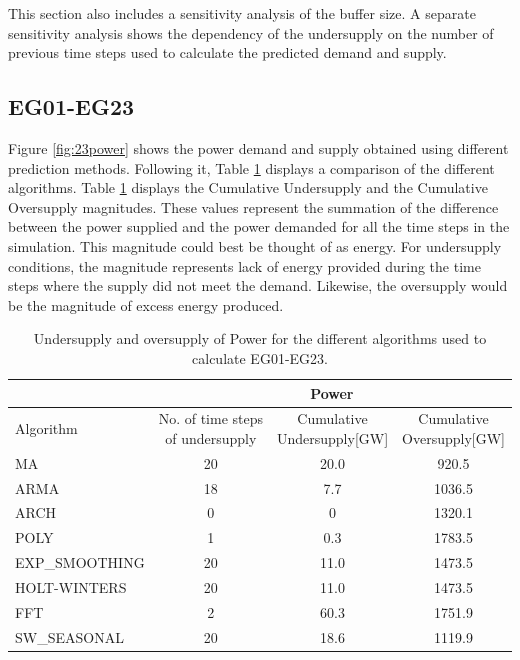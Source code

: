 \documentclass[11pt,letterpaper]{article}
\begin{document}
This section also includes a sensitivity analysis of the buffer size. A separate sensitivity analysis shows the dependency of the undersupply on the number of previous time steps used to calculate the predicted demand and supply.

\subsection{EG01-EG23}

Figure \ref{fig:23power} shows the power demand and supply obtained using different prediction methods. Following it, Table \ref{tab:23-power} displays a comparison of the different algorithms. Table \ref{tab:23-power} displays the Cumulative Undersupply and the Cumulative Oversupply magnitudes. These values represent the summation of the difference between the power supplied and the power demanded for all the time steps in the simulation. This magnitude could best be thought of as energy. For undersupply conditions, the magnitude represents lack of energy provided during the time steps where the supply did not meet the demand. Likewise, the oversupply would be the magnitude of excess energy produced.

\begin{table}[!h]
	\centering
	\caption {Undersupply and oversupply of Power for the different algorithms used to calculate EG01-EG23.}
	\label{tab:23-power}
	\begin{tabular}{|l|c|c|c|}
		\hline
		& \multicolumn{3}{c|}{Power} \\ \hline
		Algorithm & \shortstack{No. of time steps\\of undersupply}  & 
		\shortstack{Cumulative\\Undersupply[GW]}  & \shortstack{Cumulative\\Oversupply[GW]} \\ \hline
		MA        & 20 	& 20.0  &  920.5   \\ \hline
		ARMA      & 18 	&  7.7  &  1036.5  \\ \hline
		ARCH      &  0 	&   0  	&  1320.1  \\ \hline
		POLY      &  1 	&  0.3 	&  1783.5  \\ \hline
		EXP\_SMOOTHING 	& 20 	& 11.0 & 1473.5 \\ \hline
		HOLT-WINTERS  	& 20 	& 11.0 & 1473.5 \\ \hline
		FFT       & 2 	& 60.3 	& 1751.9 	\\ \hline
		SW\_SEASONAL    & 20 	& 18.6 	& 1119.9 	\\ \hline
	\end{tabular}
\end{table}
\end{document}
